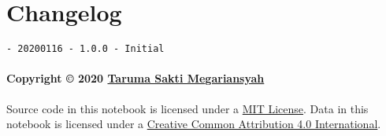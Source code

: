 \documentclass[11pt]{article}
\let\oldsection\section
\renewcommand\section{\clearpage\oldsection}
\begin{document}
    \hypertarget{changelog}{%
\section{Changelog}\label{changelog}}

\begin{verbatim}
- 20200116 - 1.0.0 - Initial
\end{verbatim}

\hypertarget{copyright-2020-taruma-sakti-megariansyah}{%
\paragraph{\texorpdfstring{Copyright © 2020
\href{https://taruma.github.io}{Taruma Sakti
Megariansyah}}{Copyright © 2020 Taruma Sakti Megariansyah}}\label{copyright-2020-taruma-sakti-megariansyah}}

Source code in this notebook is licensed under a
\href{https://choosealicense.com/licenses/mit/}{MIT License}. Data in
this notebook is licensed under a
\href{https://creativecommons.org/licenses/by/4.0/}{Creative Common
Attribution 4.0 International}.


    
    
    
\end{document}
